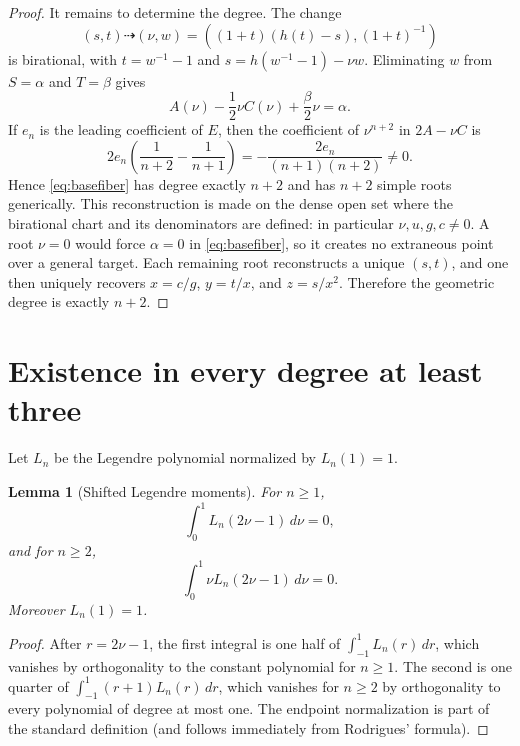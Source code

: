 \documentclass[11pt]{amsart}
\newtheorem{lemma}[theorem]{Lemma}
\theoremstyle{remark}
\begin{document}
\begin{proof}
It remains to determine the degree.  The change
\[
 (s,t)\dashrightarrow(\nu,w)=((1+t)(h(t)-s),(1+t)^{-1})
\]
is birational, with $t=w^{-1}-1$ and
$s=h(w^{-1}-1)-\nu w$.  Eliminating $w$ from $S=\alpha$ and $T=\beta$ gives
\begin{equation}\label{eq:basefiber}
 A(\nu)-\frac12\nu C(\nu)+\frac{\beta}{2}\nu=\alpha.
\end{equation}
If $e_n$ is the leading coefficient of $E$, then the coefficient of
$\nu^{n+2}$ in $2A-\nu C$ is
\[
 2e_n\left(\frac1{n+2}-\frac1{n+1}\right)
 =-\frac{2e_n}{(n+1)(n+2)}\ne0.
\]
Hence \eqref{eq:basefiber} has degree exactly $n+2$ and has $n+2$ simple roots generically.  This reconstruction is made on the dense open set where the birational chart and its denominators are defined: in particular $\nu,u,g,c\ne0$.  A root $\nu=0$ would force $\alpha=0$ in \eqref{eq:basefiber}, so it creates no extraneous point over a general target.  Each remaining root reconstructs a unique $(s,t)$, and one then uniquely recovers
$x=c/g$, $y=t/x$, and $z=s/x^2$.  Therefore the geometric degree is exactly $n+2$.
\end{proof}

\section{Existence in every degree at least three}
Let $L_n$ be the Legendre polynomial normalized by $L_n(1)=1$.

\begin{lemma}[Shifted Legendre moments]\label{lem:moments}
For $n\ge1$,
\[
 \int_0^1L_n(2\nu-1)\,d\nu=0,
\]
and for $n\ge2$,
\[
 \int_0^1\nu L_n(2\nu-1)\,d\nu=0.
\]
Moreover $L_n(1)=1$.
\end{lemma}
\begin{proof}
After $r=2\nu-1$, the first integral is one half of
$\int_{-1}^1L_n(r)\,dr$, which vanishes by orthogonality to the constant polynomial for $n\ge1$.  The second is one quarter of
$\int_{-1}^1(r+1)L_n(r)\,dr$, which vanishes for $n\ge2$ by orthogonality to every polynomial of degree at most one.  The endpoint normalization is part of the standard definition (and follows immediately from Rodrigues' formula).
\end{proof}
\end{document}
